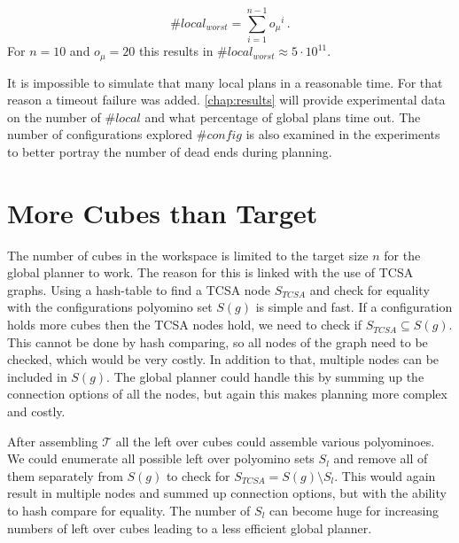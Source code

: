 \begin{equation}
\#\textit{local}_\textit{worst} = \sum_{i=1}^{n-1} {o_\mu}^i \, .
\end{equation} 
For $n = 10$ and $o_\mu = 20$ this results in $\#\textit{local}_\textit{worst} \approx 5 \cdot 10^{11}$.

It is impossible to simulate that many local plans in a reasonable time.
For that reason a timeout failure was added.
\autoref{chap:results} will provide experimental data on the number of $\#\textit{local}$ and what percentage of global plans time out.
The number of configurations explored $\#\textit{config}$ is also examined in the experiments to better portray the number of dead ends during planning.




\section{More Cubes than Target}
\label{sec:more_cubes}

The number of cubes in the workspace is limited to the target size $n$ for the global planner to work.
The reason for this is linked with the use of TCSA graphs. 
Using a hash-table to find a TCSA node $S_{\textit{TCSA}}$ and check for equality with the configurations polyomino set $S(g)$ is simple and fast.
If a configuration holds more cubes then the TCSA nodes hold, we need to check if $S_{\textit{TCSA}} \subseteq S(g)$.
This cannot be done by hash comparing, so all nodes of the graph need to be checked, which would be very costly.
In addition to that, multiple nodes can be included in $S(g)$.
The global planner could handle this by summing up the connection options of all the nodes, but again this makes planning more complex and costly.

After assembling $\mathcal{T}$ all the left over cubes could assemble various polyominoes.
We could enumerate all possible left over polyomino sets $S_l$ and remove all of them separately from $S(g)$ to check for $S_{\textit{TCSA}} = S(g) \setminus S_l$.
This would again result in multiple nodes and summed up connection options, but with the ability to hash compare for equality.
The number of $S_l$ can become huge for increasing numbers of left over cubes leading to a less efficient global planner.




